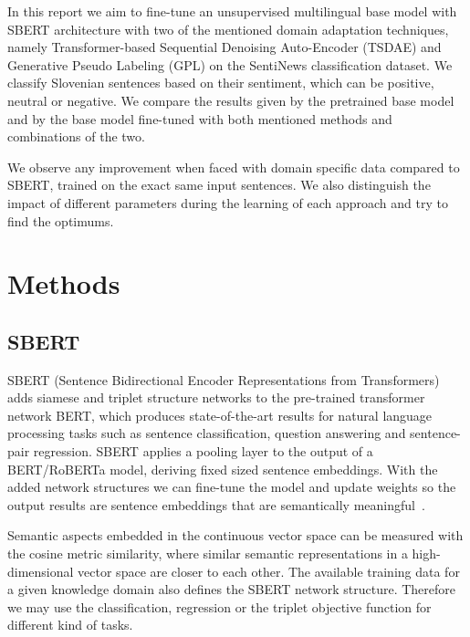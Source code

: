 \documentclass[fleqn,moreauthors,10pt]{ds_report}
\begin{document}
In this report we aim to fine-tune an unsupervised multilingual base model with SBERT architecture with two of the mentioned domain adaptation techniques, namely Transformer-based Sequential Denoising Auto-Encoder (TSDAE) and Generative Pseudo Labeling (GPL) on the SentiNews classification dataset. We classify Slovenian sentences based on their sentiment, which can be positive, neutral or negative. We compare the results given by the pretrained base model and by the base model fine-tuned with both mentioned methods and combinations of the two.

We observe any improvement when faced with domain specific data compared to SBERT, trained on the exact same input sentences. We also distinguish the impact of different parameters during the learning of each approach and try to find the optimums.






\section*{Methods}

\subsection*{SBERT}
SBERT (Sentence Bidirectional Encoder Representations from Transformers) adds siamese and triplet structure networks to the pre-trained transformer network BERT, which produces state-of-the-art results for natural language processing tasks such as sentence classification, question answering and sentence-pair regression. SBERT applies a pooling layer to the output of a BERT/RoBERTa model, deriving fixed sized sentence embeddings. With the added network structures we can fine-tune the model and update weights so the output results are sentence embeddings that are semantically meaningful~\cite{SBERT}.

Semantic aspects embedded in the continuous vector space can be measured with the cosine metric similarity, where similar semantic representations in a high-dimensional vector space are closer to each other. The available training data for a given knowledge domain also defines the SBERT network structure. Therefore we may use the classification, regression or the triplet objective function for different kind of tasks.
\end{document}
